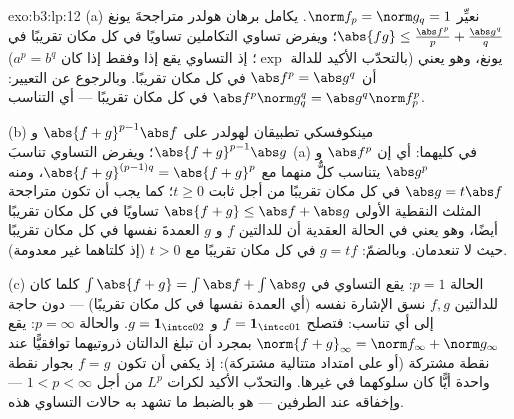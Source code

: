 \begin{solution}{exo:b3:lp:12}
(a) نعيِّر $\norm f_p = \norm g_q = 1$. يكامل برهان هولدر متراجحةَ يونغ $\abs{fg} \leq
\frac{\abs f^p}p + \frac{\abs g^q}q$؛
ويفرض تساوي التكاملين تساويًا في كل مكان تقريبًا في يونغ، وهو
يعني (بالتحدّب الأكيد للدالة $\exp$؛ إذ التساوي يقع إذا وفقط
إذا كان $a^p = b^q$) أن $\abs
f^p = \abs g^q$ في كل مكان تقريبًا. وبالرجوع عن
التعيير: $\abs f^p\norm g_q^q = \abs g^q\norm f_p^p$ في كل مكان تقريبًا --- أي التناسب.

(b) مينكوفسكي تطبيقان لهولدر على $\abs{f + g}^{p-1}
\abs f$ و $\abs{f+g}^{p-1}\abs g$؛ ويفرض
التساوي تناسبَ (a) في كليهما: أي إن $\abs f^p$ و $\abs g^p$
يتناسب كلٌّ منهما مع $\abs{f+g}^{(p-1)q} = \abs{f+g}^p$، ومنه $\abs g = t\abs f$ في كل مكان تقريبًا
من أجل ثابت $t \geq 0$؛ كما يجب أن تكون متراجحة المثلث النقطية
الأولى $\abs{f + g} \leq
\abs f + \abs g$ تساويًا في كل مكان تقريبًا أيضًا، وهو يعني في
الحالة العقدية أن للدالتين $f$ و $g$ العمدةَ نفسها في كل مكان
تقريبًا حيث لا تنعدمان. وبالضمّ: $g = tf$ في كل مكان تقريبًا مع
$t > 0$ (إذ كلتاهما غير معدومة).

(c) الحالة $p = 1$: يقع التساوي في $\int\abs{f + g} = \int\abs f +
\int\abs g$ كلما كان للدالتين
$f, g$ نسق الإشارة نفسه (أي العمدة نفسها في كل مكان تقريبًا)
--- دون حاجة إلى أي تناسب: فتصلح $f = \mathbf 1_{\intcc01}$ و $g = \mathbf 1_{\intcc02}$. والحالة
$p = \infty$: يقع $\norm{f+g}_\infty = \norm f_\infty +
\norm g_\infty$ بمجرد أن تبلغ الدالتان ذروتيهما
توافقيًّا عند نقطة مشتركة (أو على امتداد متتالية مشتركة): إذ
يكفي أن تكون $f = g\,$ بجوار نقطة واحدة أيًّا كان سلوكهما في
غيرها. والتحدّب الأكيد لكرات $L^p$ من أجل $1 <
p < \infty$ --- وإخفاقه
عند الطرفين --- هو بالضبط ما تشهد به حالات التساوي هذه.
\end{solution}

